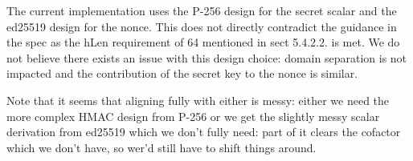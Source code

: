 The current implementation uses the P-256 design for the secret scalar and the ed25519 design for the nonce. This does not directly contradict the guidance in the spec as the hLen requirement of 64 mentioned in sect 5.4.2.2. is met. We do not believe there exists an issue with this design choice: domain separation is not impacted and the contribution of the secret key to the nonce is similar. 

Note that it seems that aligning fully with either is messy: either we need the more complex HMAC design from P-256 or we get the slightly messy scalar derivation from ed25519 which we don’t fully need: part of it clears the cofactor which we don’t have, so wer'd still have to shift things around.

